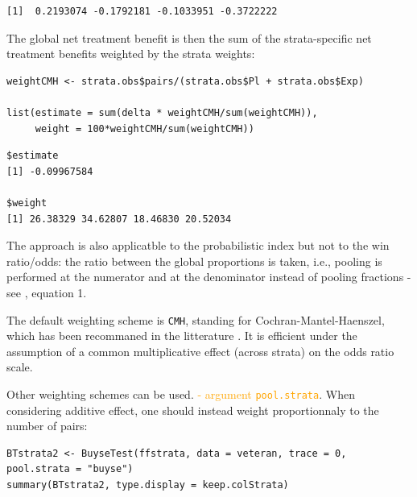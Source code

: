 \documentclass[12pt]{article}
\newcommand\Warning[1][3ex]{%
\renewcommand\stacktype{L}%
\scaleto{\stackon[1.3pt]{\color{red}$\triangle$}{\tiny\bfseries !}}{#1}%
\xspace
}
\begin{document}
\begin{verbatim}
[1]  0.2193074 -0.1792181 -0.1033951 -0.3722222
\end{verbatim}


The global net treatment benefit is then the sum of the strata-specific net
treatment benefits weighted by the strata weights:
\lstset{language=r,label= ,caption= ,captionpos=b,numbers=none}
\begin{lstlisting}
weightCMH <- strata.obs$pairs/(strata.obs$Pl + strata.obs$Exp)

list(estimate = sum(delta * weightCMH/sum(weightCMH)),
     weight = 100*weightCMH/sum(weightCMH))
\end{lstlisting}

\begin{verbatim}
$estimate
[1] -0.09967584

$weight
[1] 26.38329 34.62807 18.46830 20.52034
\end{verbatim}


\Warning The approach is also applicatble to the probabilistic index
but not to the win ratio/odds: the ratio between the global
proportions is taken, i.e., pooling is performed at the numerator and
at the denominator instead of pooling fractions - see
\cite{dong2018stratified}, equation 1.


\clearpage

The default weighting scheme is \texttt{CMH}, standing for
Cochran-Mantel-Haenszel, which has been recommaned in the litterature
\citep{dong2018stratified}. It is efficient under the assumption of a
common multiplicative effect (across strata) on the odds ratio
scale. 

\bigskip 

Other weighting schemes can be used. \hfill
\textcolor{orange}{- argument
\texttt{pool.strata}}. \newline When considering additive effect,
one should instead weight proportionnaly to the number of pairs:
\lstset{language=r,label= ,caption= ,captionpos=b,numbers=none}
\begin{lstlisting}
BTstrata2 <- BuyseTest(ffstrata, data = veteran, trace = 0, pool.strata = "buyse")
summary(BTstrata2, type.display = keep.colStrata)
\end{lstlisting}
\end{document}
